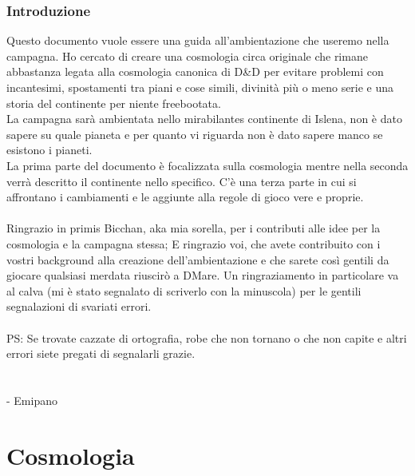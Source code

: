 \documentclass[10pt, a4paper]{report}
\newcommand{\partimagefile}{}
\newcommand{\partimage}[1]{%
	\renewcommand{\partimagefile}{#1}%
}
\begin{document}
\section{Introduzione}
Questo documento vuole essere una guida all'ambientazione che useremo nella campagna. Ho cercato di creare una cosmologia circa originale che rimane abbastanza legata alla cosmologia canonica di D\&D per evitare problemi con incantesimi, spostamenti tra piani e cose simili, divinità più o meno serie e una storia del continente per niente freebootata.\\
La campagna sarà ambientata nello mirabilantes continente di Islena, non è dato sapere su quale pianeta e per quanto vi riguarda non è dato sapere manco se esistono i pianeti. \\
La prima parte del documento è focalizzata sulla cosmologia mentre nella seconda verrà descritto il continente nello specifico. C'è una terza parte in cui si affrontano i cambiamenti e le aggiunte alla regole di gioco vere e proprie.\\
\\
Ringrazio in primis Bicchan, aka mia sorella, per i contributi alle idee per la cosmologia e la campagna stessa; E ringrazio voi, che avete contribuito con i vostri background alla creazione dell'ambientazione e che sarete così gentili da giocare qualsiasi merdata riuscirò a DMare. Un ringraziamento in particolare va al calva (mi è stato segnalato di scriverlo con la minuscola) per le gentili segnalazioni di svariati errori.\\
\\
PS: Se trovate cazzate di ortografia, robe che non tornano o che non capite e altri errori siete pregati di segnalarli grazie.  \\
\\
\\
- Emipano

\partimage{cosmpart1.png}
\part{Cosmologia}
\end{document}
